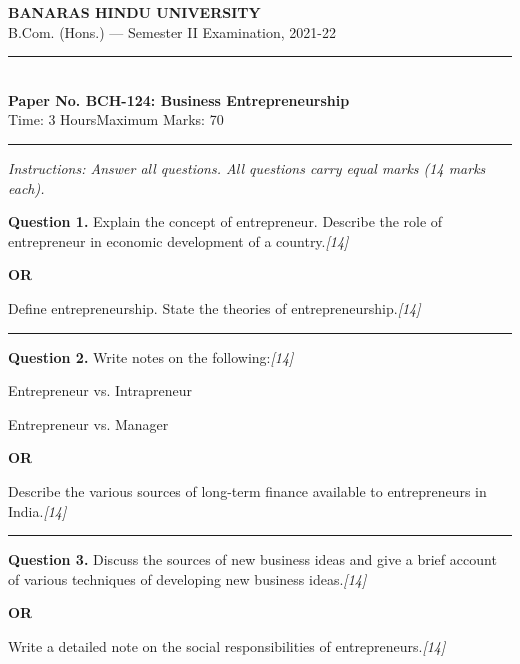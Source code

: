 \documentclass[11pt,a4paper]{article}
\newcommand{\pts}[1]{\hfill   \textit{[#1]}}
\begin{document}
\begin{center}
  {\large\bfseries BANARAS HINDU UNIVERSITY}\\[2pt]
  {\normalsize B.Com. (Hons.) --- Semester II Examination, 2021-22}\\[6pt]
  \rule{0.8\linewidth}{0.5pt}\\[6pt]
  {\large\bfseries Paper No. BCH-124: Business Entrepreneurship}\\[4pt]
  {\normalsize Time: 3 Hours\hfill Maximum Marks: 70}
\end{center}

\rule{\linewidth}{0.4pt}

\smallskip



\noindent   \textit{Instructions: Answer all questions. All questions carry equal marks (14 marks each).}

\bigskip




\noindent   \textbf{Question 1.}
Explain the concept of entrepreneur. Describe the role of entrepreneur in economic development of a country.\pts{14}

\centerline{   \textbf{OR}}

Define entrepreneurship. State the theories of entrepreneurship.\pts{14}

\medskip\rule{\linewidth}{0.2pt}




\noindent   \textbf{Question 2.}
Write notes on the following:\pts{14}

\begin{parts}
  \item Entrepreneur vs. Intrapreneur
  \item Entrepreneur vs. Manager
\end{parts}

\centerline{   \textbf{OR}}

Describe the various sources of long-term finance available to entrepreneurs in India.\pts{14}

\medskip\rule{\linewidth}{0.2pt}




\noindent   \textbf{Question 3.}
Discuss the sources of new business ideas and give a brief account of various techniques of developing new business ideas.\pts{14}

\centerline{   \textbf{OR}}

Write a detailed note on the social responsibilities of entrepreneurs.\pts{14}
\end{document}
